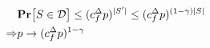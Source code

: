 {            \begin{equation*}
              \begin{split}
                & \mathbf{Pr} \big[  S \in \mathcal{D} \big] \le (c_{f}^{\Delta} p)^{|S^{\prime}|} \le (c_{f}^{\Delta} p)^{(1-\gamma)|S|} \\
                \Rightarrow & p \rightarrow (c_{f}^{\Delta} p)^{1-\gamma} 
              \end{split}
            \end{equation*}
}


